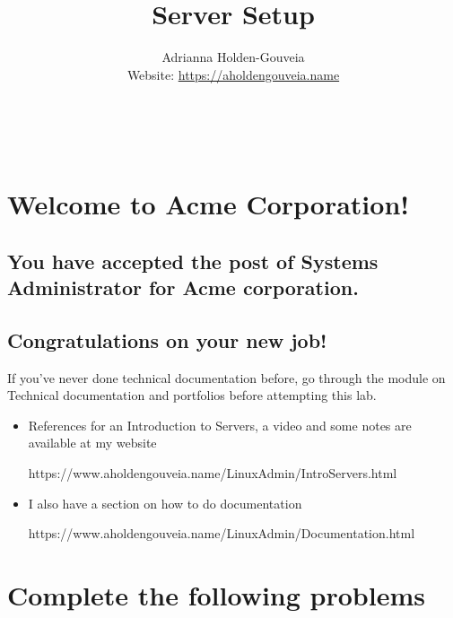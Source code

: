 \documentclass[12pt]{article}
\title{Server Setup}
\author{
        Adrianna Holden-Gouveia \\
        Website: \url{https://aholdengouveia.name}\\ 
        \date{\vspace{-5ex}}
        \faLinkedin{: aholdengouveia} \\
        \faGithub {: aholdengouveia} \\
        }
\begin{document}
    

\maketitle


\section*{Welcome to Acme Corporation!}
\subsection*{You have accepted the post of Systems Administrator for Acme corporation.} 
\subsection*{Congratulations on your new job!}

If you've never done technical documentation before, go through the module on Technical documentation and portfolios before attempting this lab.

    \begin{itemize}
\item References for an Introduction to Servers, a video and some notes are available at my website

https://www.aholdengouveia.name/LinuxAdmin/IntroServers.html 


\item I also have a section on how to do documentation 

https://www.aholdengouveia.name/LinuxAdmin/Documentation.html


\end{itemize}

\section*{Complete the following problems}
\end{document}

